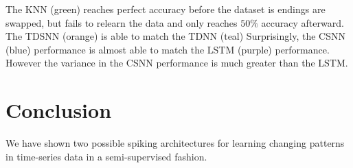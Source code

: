 \documentclass{article}
\begin{document}
The KNN (green) reaches perfect accuracy before the dataset is endings are swapped, but fails to relearn the data and only reaches $50\%$ accuracy afterward. The TDSNN (orange) is able to match the TDNN (teal) Surprisingly, the CSNN (blue) performance is almost able to match the LSTM (purple) performance. However the variance in the CSNN performance is much greater than the LSTM.




\section*{Conclusion}

We have shown two possible spiking architectures for learning changing patterns in time-series data in a semi-supervised fashion.


\newpage
\printbibliography[title={References}]
\end{document}
